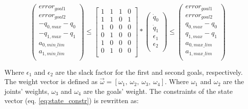 $$
\left( \begin{array}{c}
error_{goal1} \\
error_{goal2} \\
-q_{0,max} - q_{0} \\
-q_{1,max} - q_{1} \\
a_{0,min\_lim} \\
a_{1,min\_lim} \\
\end{array}
\right)	\leq 
\left[ \begin{array}{cccc}
1 & 1 & 1 & 0 \\
1 & 1 & 0 & 1 \\
1 & 0 & 0 & 0 \\
0 & 1 & 0 & 0 \\
1 & 0 & 0 & 0 \\
0 & 1 & 0 & 0 \\
\end{array}
\right] *
\left( \begin{array}{c}
\dot{q}_{0} \\
\dot{q}_{1} \\
\epsilon_1 \\
\epsilon_2 \\
\end{array}
\right) 
\leq \left( \begin{array}{c}
error_{goal1} \\
error_{goal2} \\
q_{0,max} - q_{0} \\
q_{1,max} - q_{1} \\
a_{0,max\_lim} \\
a_{1,max\_lim} \\
\end{array}
\right)
$$

Where $\epsilon_1$ and $\epsilon_2$ are the slack factor for the first  and second goals, respectively. The weight vector is defined as $\vec{\omega} = [ \omega_{1},\ \omega_{2},\ \omega_{3},\ \omega_{4} ]$. Where $\omega_{1}$ and $\omega_{2}$ are the joints' weights, $\omega_{3}$ and $\omega_{4}$ are the goals' weight. The constraints of the state vector (eq. \ref{eq:state_constr}) is rewritten as:

